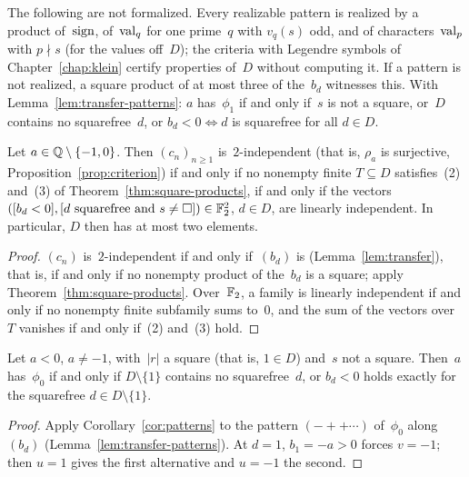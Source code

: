 \begin{remark}
  \label{rem:patterns}
  The following are not formalized. Every realizable pattern is realized by a product of~$\operatorname{sign}$,
  of~$\operatorname{val}_q$ for one prime~$q$ with $v_q(s)$ odd, and of characters~$\operatorname{val}_p$ with $p \nmid s$
  (for the values off~$D$); the criteria with Legendre symbols of Chapter~\ref{chap:klein}
  certify properties of~$D$ without computing it. If a pattern is not realized, a square product
  of at most three of the~$b_d$ witnesses this. With Lemma~\ref{lem:transfer-patterns}: $a$
  has~$\phi_1$ if and only if~$s$ is not a square, or~$D$ contains no squarefree~$d$, or
  $b_d < 0 \iff d$ is squarefree for all $d \in D$.
\end{remark}

\begin{corollary}
  \label{cor:independence}
  \leanok
  Let $a \in \mathbb{Q} \setminus \{-1, 0\}$. Then $(c_n)_{n \ge 1}$ is~$2$-independent (that is,
  $\rho_a$ is surjective, Proposition~\ref{prop:criterion}) if and only if no nonempty finite
  $T \subseteq D$ satisfies~(2) and~(3) of Theorem~\ref{thm:square-products}, if and only if the
  vectors $([b_d < 0], [d \text{ squarefree and } s \ne \square]) \in \mathbb{F}_2^2$, $d \in D$, are
  linearly independent. In particular, $D$ then has at most two elements.
\end{corollary}
\begin{proof}
  \leanok
  $(c_n)$ is~$2$-independent if and only if~$(b_d)$ is (Lemma~\ref{lem:transfer}), that is, if
  and only if no nonempty product of the~$b_d$ is a square; apply
  Theorem~\ref{thm:square-products}. Over~$\mathbb{F}_2$, a family is linearly independent if and only if
  no nonempty finite subfamily sums to~$0$, and the sum of the vectors over~$T$ vanishes if and
  only if~(2) and~(3) hold.
\end{proof}

\begin{corollary}
  \label{cor:phi0-open}
  \leanok
  Let $a < 0$, $a \ne -1$, with~$|r|$ a square (that is, $1 \in D$) and~$s$ not a square. Then~$a$
  has~$\phi_0$ if and only if $D \setminus \{1\}$ contains no squarefree~$d$, or $b_d < 0$ holds
  exactly for the squarefree $d \in D \setminus \{1\}$.
\end{corollary}
\begin{proof}
  \leanok
  Apply Corollary~\ref{cor:patterns} to the pattern $({-}{+}{+}\cdots)$ of~$\phi_0$ along~$(b_d)$
  (Lemma~\ref{lem:transfer-patterns}). At $d = 1$, $b_1 = -a > 0$ forces $v = -1$; then $u = 1$
  gives the first alternative and $u = -1$ the second.
\end{proof}

